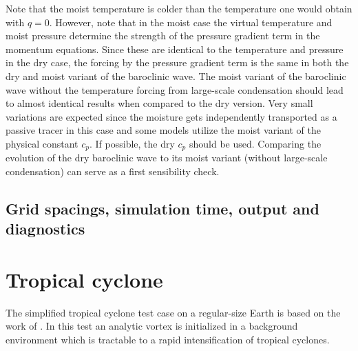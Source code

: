 \documentclass[times,doublespace]{fldauth}
\begin{document}
Note that the moist temperature is colder than the temperature one would obtain with $q = 0$. However, note that in the moist case the virtual temperature and moist pressure determine the strength of the pressure gradient term in the momentum equations. Since these are identical to the temperature and pressure in the dry case, the forcing by the pressure gradient term is the same in both the dry and moist variant of the baroclinic wave. The moist variant of the baroclinic wave without the temperature forcing from large-scale condensation should lead to almost identical results when compared to the dry version. Very small variations are expected since the moisture gets independently transported as a passive tracer in this case and some models utilize the moist variant of the physical constant $c_p$. If possible, the dry $c_p$ should be used. Comparing the evolution of the dry baroclinic wave to its moist variant (without large-scale condensation) can serve as a first sensibility check.

\subsection{Grid spacings, simulation time, output and diagnostics}

\clearpage

\section{Tropical cyclone}

The simplified tropical cyclone test case on a regular-size Earth is based on the work of \cite{reed2012idealized, reed2011analytic,reed2011impact, reed2011assessing}.  In this test an analytic vortex is initialized in a background environment which is tractable to a rapid intensification of tropical cyclones.  
\end{document}
